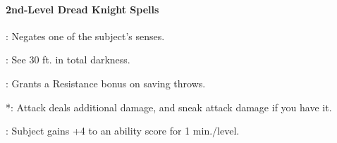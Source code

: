 \paragraph{2nd-Level Dread Knight Spells}
\begin{list}{}{\leftmargin=1em}
\item {}: Negates one of the subject's senses. %
\item {}: See 30 ft. in total darkness. %
\item {}: Grants a Resistance bonus on saving throws.
\item {}*: Attack deals additional damage, and sneak attack damage if you have it. %
\item {}: Subject gains +4 to an ability score for 1 min./level.
\end{list}
